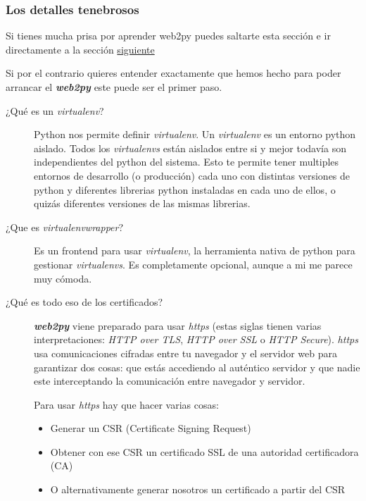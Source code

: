 \documentclass[
  12pt,
  spanish,
]{article}
\providecommand{\tightlist}{%
  \setlength{\itemsep}{0pt}\setlength{\parskip}{0pt}}
\begin{document}
\hypertarget{los-detalles-tenebrosos}{%
\subsubsection{Los detalles tenebrosos}\label{los-detalles-tenebrosos}}

Si tienes mucha prisa por aprender web2py puedes saltarte esta sección e
ir directamente a la sección
\protect\hyperlink{nuestra-primera-aplicaciuxf3n}{siguiente}

Si por el contrario quieres entender exactamente que hemos hecho para
poder arrancar el \textbf{\emph{web2py}} este puede ser el primer paso.

\begin{description}
\item[¿Qué es un \emph{virtualenv}?]
Python nos permite definir \emph{virtualenv}. Un \emph{virtualenv} es un
entorno python aislado. Todos los \emph{virtualenvs} están aislados
entre si y mejor todavía son independientes del python del sistema. Esto
te permite tener multiples entornos de desarrollo (o producción) cada
uno con distintas versiones de python y diferentes librerias python
instaladas en cada uno de ellos, o quizás diferentes versiones de las
mismas librerias.
\item[¿Que es \emph{virtualenvwrapper}?]
Es un frontend para usar \emph{virtualenv}, la herramienta nativa de
python para gestionar \emph{virtualenvs}. Es completamente opcional,
aunque a mi me parece muy cómoda.
\item[¿Qué es todo eso de los certificados?]
\textbf{\emph{web2py}} viene preparado para usar \emph{https} (estas
siglas tienen varias interpretaciones: \emph{HTTP over TLS}, \emph{HTTP
over SSL} o \emph{HTTP Secure}). \emph{https} usa comunicaciones
cifradas entre tu navegador y el servidor web para garantizar dos cosas:
que estás accediendo al auténtico servidor y que nadie este
interceptando la comunicación entre navegador y servidor.

Para usar \emph{https} hay que hacer varias cosas:

\begin{itemize}
\tightlist
\item
  Generar un CSR (Certificate Signing Request)
\item
  Obtener con ese CSR un certificado SSL de una autoridad certificadora
  (CA)
\item
  O alternativamente generar nosotros un certificado a partir del CSR
\end{itemize}


\end{description}
\end{document}
